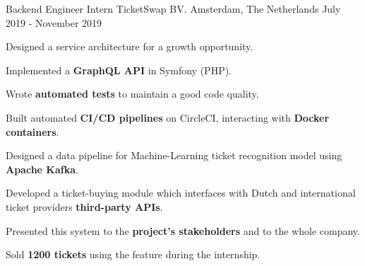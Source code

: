

\begin{cventries}

  \cventry
    {Backend Engineer Intern} %
    {TicketSwap BV.} %
    {Amsterdam, The Netherlands} %
    {July 2019 - November 2019} %
    {
      \begin{cvitems} %
        \item {Designed a service architecture for a growth opportunity.}
        \item {Implemented a \textbf{GraphQL API} in Symfony (PHP).}
        \item {Wrote \textbf{automated tests} to maintain a good code quality.}
        \item {Built automated \textbf{CI/CD pipelines} on CircleCI, interacting with \textbf{Docker containers}.}
        \item {Designed a data pipeline for Machine-Learning ticket recognition model using \textbf{Apache Kafka}.}
        \item {Developed a ticket-buying module which interfaces with Dutch and international ticket providers \textbf{third-party APIs}.}
        \item {Presented this system to the \textbf{project's stakeholders} and to the whole company.}
        \item {Sold \textbf{1200 tickets} using the feature during the internship.}
      \end{cvitems}
    }

\end{cventries}
